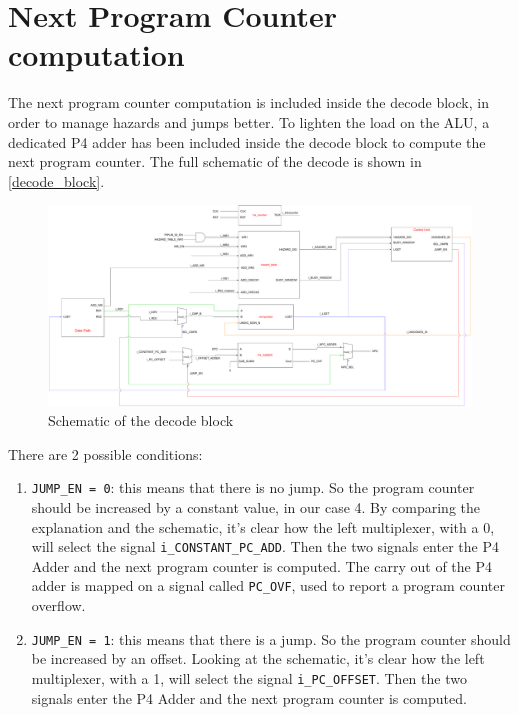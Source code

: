 \section{Next Program Counter computation}
The next program counter computation is included inside the decode block, in order to manage hazards and jumps better. To lighten the load on the ALU, a dedicated P4 adder has been included inside the decode block to compute the next program counter. 
The full schematic of the decode is shown in \autoref{decode_block}.

\begin{figure}[H]
	\centering
  \addtolength{\leftskip}{-3cm}
  \addtolength{\rightskip}{-3cm}
	\includegraphics[width=1.2\textwidth]{chapters/4_DecodeStage/images/decode_block.pdf}
	\caption{Schematic of the decode block}
	\label{decode_block}
\end{figure}

There are 2 possible conditions:

\begin{enumerate}
  \item \texttt{JUMP\_EN = 0}: this means that there is no jump. So the program counter should be increased by a constant value, in our case 4. By comparing the explanation and the schematic, it's clear how the left multiplexer, with a 0, will select the signal \texttt{i\_CONSTANT\_PC\_ADD}. Then the two signals enter the P4 Adder and the next program counter is computed. The carry out of the P4 adder is mapped on a signal called \texttt{PC\_OVF}, used to report a program counter overflow. 
  \item \texttt{JUMP\_EN = 1}: this means that there is a jump. So the program counter should be increased by an offset. Looking at the schematic, it's clear how the left multiplexer, with a 1, will select the signal \texttt{i\_PC\_OFFSET}. Then the two signals enter the P4 Adder and the next program counter is computed. 
\end{enumerate}

